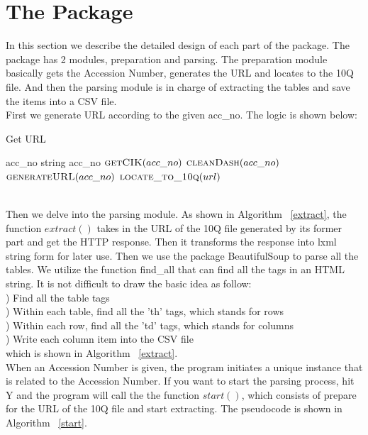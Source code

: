 \documentclass[conference]{IEEEtran}
\begin{document}
\section{The Package}\label{iii}
\indent In this section we describe the detailed design of each part of the package. The package has 2 modules, preparation and parsing. The preparation module basically gets the Accession Number, generates the URL and locates to the 10Q file. And then the parsing module is in charge of extracting the tables and save the items into a CSV file.
\\
\indent First we generate URL according to the given acc\_no. The logic is shown below:
\begin{algorithm}\label{extract}
\caption{Get URL}
\begin{algorithmic}[1]
	\Require acc\_no
	\Ensure 			
	 {string acc\_no}
		\State $\Call {getCIK}{acc\_no}$
		\State $\Call {cleanDash}{acc\_no}$
		\State $\Call {generateURL}{acc\_no}$
		\State $\Call {locate\_to\_10q}{url}$ 
	\EndFunction
\end{algorithmic}
\end{algorithm}
\\
\indent Then we delve into the parsing module. As shown in Algorithm ~\ref{extract}, the function $extract()$ takes in the URL of the 10Q file generated by its former part and get the HTTP response. Then it transforms the response into lxml string form for later use. Then we use the package BeautifulSoup to parse all the tables. We utilize the function find\_all that can find all the tags in an HTML string. It is not difficult to draw the basic idea as follow:
\\
) Find all the table tags \\
) Within each table, find all the 'th' tags, which stands for rows \\
) Within each row, find all the 'td' tags, which stands for columns \\
) Write each column item into the CSV file \\
which is shown in Algorithm ~\ref{extract}. \\
\indent When an Accession Number is given, the program initiates a unique instance that is related to the Accession Number. If you want to start the parsing process, hit Y and the program will call the the function $start()$, which consists of prepare for the URL of the 10Q file and start extracting. The pseudocode is shown in Algorithm ~\ref{start}.
\end{document}
